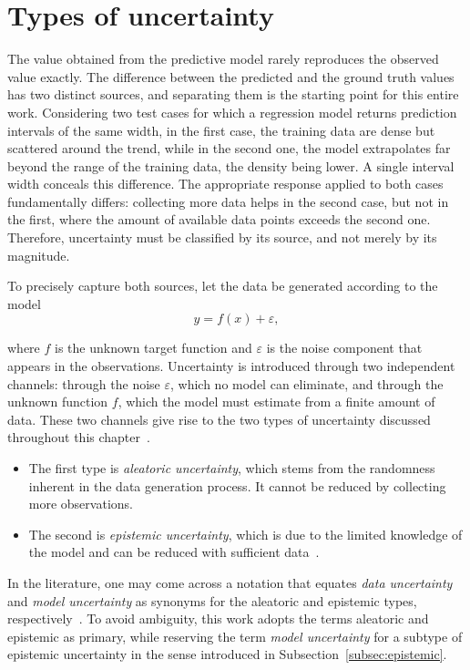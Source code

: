 

\section{Types of uncertainty}
\label{sec:types-of-uncertainty}

The value obtained from the predictive model rarely reproduces the observed value exactly. The difference between the predicted and the ground truth values has two distinct sources, and separating them is the starting point for this entire work. Considering two test cases for which a regression model returns prediction intervals of the same width, in the first case, the training data are dense but scattered around the trend, while in the second one, the model extrapolates far beyond the range of the training data, the density being lower. A single interval width conceals this difference. The appropriate response applied to both cases fundamentally differs: collecting more data helps in the second case, but not in the first, where the amount of available data points exceeds the second one. Therefore, uncertainty must be classified by its source, and not merely by its magnitude.

To precisely capture both sources, let the data be generated according to the model
%
\begin{equation}
    y = f(x) + \varepsilon ,
    \label{eq:generative-model}
\end{equation}
%

where $f$ is the unknown target function and $\varepsilon$ is the noise component that appears in the observations. Uncertainty is introduced through two independent channels: through the noise $\varepsilon$, which no model can eliminate, and through the unknown function $f$, which the model must estimate from a finite amount of data. These two channels give rise to the two types of uncertainty discussed throughout this chapter~\cite{hullermeier2021, he2025}.
\begin{itemize}
    \item The first type is \emph{aleatoric uncertainty}, which stems from the randomness inherent in the data generation process. It cannot be reduced by collecting more observations. 
    \item The second is \emph{epistemic uncertainty}, which is due to the limited knowledge of the model and can be reduced with sufficient data~\cite{kendall2017}. 
\end{itemize}

In the literature, one may come across a notation that equates \emph{data uncertainty} and \emph{model uncertainty} as synonyms for the aleatoric and epistemic types, respectively~\cite{he2025, gawlikowski2023}. To avoid ambiguity, this work adopts the terms aleatoric and epistemic as primary, while reserving the term \emph{model uncertainty} for a subtype of epistemic uncertainty in the sense introduced in Subsection~\ref{subsec:epistemic}.

